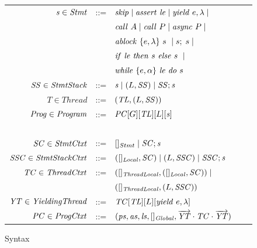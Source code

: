 \begin{figure}
\setlength{\tabcolsep}{3pt}
\begin{tabular}{rclcl}
$\mathit{s} \in \mathit{Stmt}$ &::= & $\mathit{skip} \mid \mathit{assert}\ \mathit{le} \mid \mathit{yield}\ e,\lambda \mid$ \\
                  & & $\mathit{call}\ A \mid \mathit{call}\ P \mid \mathit{async}\ P \mid $\\
                  & & $\mathit{ablock}\ {\{e,\lambda\}}\ {s}\  \mid s;\;s \mid$\\
                  & & ${\mathit{if}\ {\mathit{le}}\ }{\mathit{then}\ {s}\ }{\mathit{else}\ {s}\ } \mid$ \\
                  & & $\mathit{while}\ \{{e,\alpha}\}\ {{\mathit{le}}\ } \mathit{do}\ {{s}\ }$ \\ 
$\mathit{SS} \in \mathit{StmtStack}$ &::= & $\mathit{s} \mid (L,\mathit{SS}) \mid \mathit{SS};\mathit{s}$ \\
$T \in \mathit{Thread}$ &::= &$(\mathit{TL}, (L, \mathit{SS}))$ \\
$\mathit{Prog} \in \mathit{Program}$ &::= & $\mathit{PC}[G][\mathit{TL}][L][\mathit{s}]$ \\
~\\
$\mathit{SC} \in \mathit{StmtCtxt}$ &::= &$[]_{Stmt} \mid \mathit{SC};\mathit{s}$ \\
$\mathit{SSC} \in \mathit{StmtStackCtxt}$ &::= & $([]_{\mathit{Local}}, \mathit{SC}) \mid (L,\mathit{SSC}) \mid \mathit{SSC};\mathit{s}$ \\
$\mathit{TC} \in \mathit{ThreadCtxt}$ &::= &$([]_{\mathit{ThreadLocal}}, ([]_{\mathit{Local}}, \mathit{SC})) \mid$ \\
 & &$([]_{\mathit{ThreadLocal}}, (L, \mathit{SSC}))$ \\
$\mathit{YT} \in \mathit{YieldingThread}$ &::= &$\mathit{TC}[\mathit{TL}][L][\mathit{yield}\ e,\lambda]$ \\
$\mathit{PC} \in \mathit{ProgCtxt}$ &::= & $(\mathit{ps}, \mathit{as}, \mathit{ls}, []_{\mathit{Global}}, \overrightarrow{\mathit{YT}} \cdot \mathit{TC} \cdot \overrightarrow{\mathit{YT}})$
\end{tabular}
\caption{Syntax}
\label{fig:syntax}
\end{figure}

